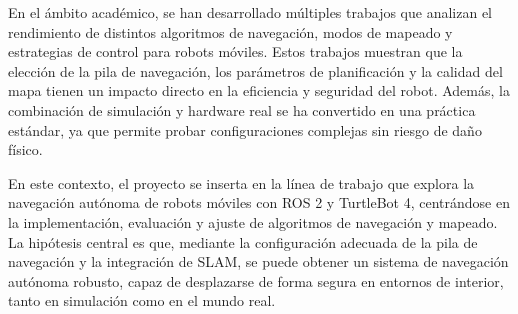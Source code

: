 En el ámbito académico, se han desarrollado múltiples trabajos que analizan el rendimiento de distintos algoritmos de navegación, modos de mapeado y estrategias de control para robots móviles. Estos trabajos muestran que la elección de la pila de navegación, los parámetros de planificación y la calidad del mapa tienen un impacto directo en la eficiencia y seguridad del robot. Además, la combinación de simulación y hardware real se ha convertido en una práctica estándar, ya que permite probar configuraciones complejas sin riesgo de daño físico.

En este contexto, el proyecto se inserta en la línea de trabajo que explora la navegación autónoma de robots móviles con ROS 2 y TurtleBot 4, centrándose en la implementación, evaluación y ajuste de algoritmos de navegación y mapeado. La hipótesis central es que, mediante la configuración adecuada de la pila de navegación y la integración de SLAM, se puede obtener un sistema de navegación autónoma robusto, capaz de desplazarse de forma segura en entornos de interior, tanto en simulación como en el mundo real.
